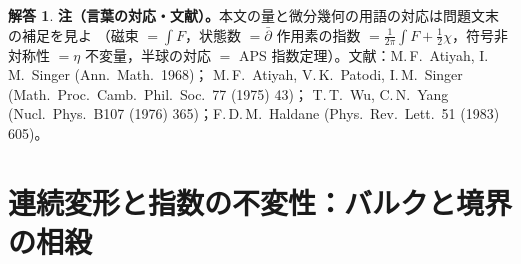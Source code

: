 \documentclass[dvipdfmx, uplatex]{jsarticle}
\theoremstyle{definition}
\newtheorem*{sol}{解答}
\begin{document}
\begin{sol}
\par\smallskip
\noindent\textbf{注（言葉の対応・文献）。}本文の量と微分幾何の用語の対応は問題文末の補足を見よ
（磁束 $=\int F$，状態数 $=\bar\partial$ 作用素の指数 $=\frac1{2\pi}\int F+\tfrac12\chi$，符号非対称性
$=\eta$ 不変量，半球の対応 $=$ APS 指数定理）。文献：M.\,F.~Atiyah, I.\,M.~Singer (Ann.\ Math.\ 1968)；
M.\,F.~Atiyah, V.\,K.~Patodi, I.\,M.~Singer (Math.\ Proc.\ Camb.\ Phil.\ Soc.\ 77 (1975) 43)；
T.\,T.~Wu, C.\,N.~Yang (Nucl.\ Phys.\ B107 (1976) 365)；F.\,D.\,M.~Haldane (Phys.\ Rev.\ Lett.\ 51 (1983) 605)。
\end{sol}

\section{連続変形と指数の不変性：バルクと境界の相殺}
\end{document}
